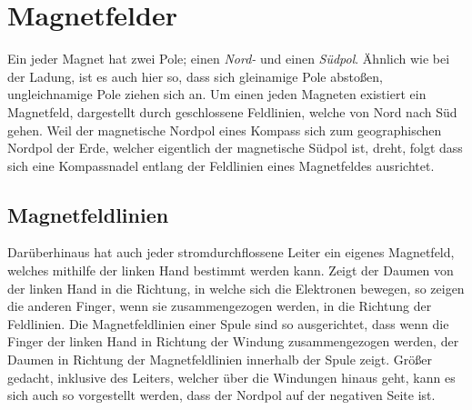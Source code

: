 \documentclass{article}
\begin{document}
\section{Magnetfelder}
Ein jeder Magnet hat zwei Pole; einen \emph{Nord-} und einen \emph{Südpol}. Ähnlich wie bei der Ladung, ist es auch hier so, dass sich gleinamige Pole abstoßen, ungleichnamige Pole ziehen sich an. \newline  
Um einen jeden Magneten existiert ein Magnetfeld, dargestellt durch geschlossene Feldlinien, welche von Nord nach Süd gehen. Weil der magnetische Nordpol eines Kompass sich zum geographischen Nordpol der Erde, welcher eigentlich der magnetische Südpol ist, dreht, folgt dass sich eine Kompassnadel entlang der Feldlinien eines Magnetfeldes ausrichtet.
 
\subsection{Magnetfeldlinien}
\begin{minipage}{\dimexpr\linewidth-3cm} 
 Darüberhinaus hat auch jeder stromdurchflossene Leiter ein eigenes Magnetfeld, welches mithilfe der linken Hand bestimmt werden kann. Zeigt der Daumen von der linken Hand in die Richtung, in welche sich die Elektronen bewegen, so zeigen die anderen Finger, wenn sie zusammengezogen werden, in die Richtung der Feldlinien. \newline
 Die Magnetfeldlinien einer Spule sind so ausgerichtet, dass wenn die Finger der linken Hand in Richtung der Windung zusammengezogen werden, der Daumen in Richtung der Magnetfeldlinien innerhalb der Spule zeigt. Größer gedacht, inklusive des Leiters, welcher über die Windungen hinaus geht, kann es sich auch so vorgestellt werden, dass der Nordpol auf der negativen Seite ist.
\end{minipage}
\hfill
\begin{minipage}{3cm}
 \center
\end{minipage}
 
\end{document}

